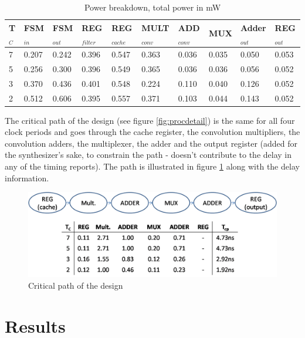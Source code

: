 \documentclass[11pt,a4paper]{article}
\begin{document}
\begin{table}
	\caption{Power breakdown, total power in mW}
	\begin{center}
		\begin{tabular}{|l|l|l|l|l|l|l|l|l|l|} \hline
			\textbf{T}$_{C}$ & \textbf{FSM}$_{in}$ & \textbf{FSM}$_{out}$ & \textbf{REG}$_{filter}$ & \textbf{REG}$_{cache}$ & \textbf{MULT}$_{conv}$ & \textbf{ADD}$_{conv}$ & \textbf{MUX} & \textbf{Adder}$_{out}$ & \textbf{REG}$_{out}$ \\ \hline
			7 & 0.207 & 0.242 & 0.396 & 0.547 & 0.363 & 0.036 & 0.035 & 0.050 & 0.053 \\ \hline
			5 & 0.256 & 0.300 & 0.396 & 0.549 & 0.365 & 0.036 & 0.036 & 0.056 & 0.052 \\ \hline 
			3 & 0.370 & 0.436 & 0.401 & 0.548 & 0.224 & 0.110 & 0.040 & 0.126 & 0.052 \\ \hline
			2 & 0.512 & 0.606 & 0.395 & 0.557 & 0.371 & 0.103 & 0.044 & 0.143 & 0.052 \\ \hline
		\end{tabular}
	\end{center}
	\label{tab:broken}
\end{table}

The critical path of the design (see figure \ref{fig:procdetail}) is the same for all four clock periods and goes through the cache register, the convolution multipliers, the convolution adders, the multiplexer, the adder and the output register (added for the synthesizer's sake, to constrain the path - doesn't contribute to the delay in any of the timing reports). The path is illustrated in figure \ref{fig:critical} along with the delay information.

\begin{figure}[h]
	\centering
		\includegraphics[width=6in]{./images/criticalpath.PNG}
	\caption{Critical path of the design}	\label{fig:critical}
\end{figure}

\FloatBarrier
\section{Results}
\label{sec:results}
\end{document}

